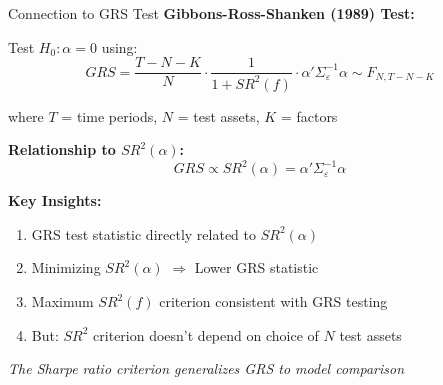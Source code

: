 \documentclass{beamer}
\begin{document}
\begin{frame}{Connection to GRS Test}
    \textbf{Gibbons-Ross-Shanken (1989) Test:}
    
    Test $H_0: \alpha = 0$ using:
    \begin{equation}\label{eq:grs_test}
        GRS = \frac{T-N-K}{N} \cdot \frac{1}{1 + SR^2(f)} \cdot \alpha' \Sigma_\varepsilon^{-1} \alpha \sim F_{N, T-N-K}
    \end{equation}
    
    where $T$ = time periods, $N$ = test assets, $K$ = factors
    
    \vspace{0.3cm}
    \textbf{Relationship to $SR^2(\alpha)$:}
    \begin{equation*}
        GRS \propto SR^2(\alpha) = \alpha' \Sigma_\varepsilon^{-1} \alpha
    \end{equation*}
    
    
    \textbf{Key Insights:}
    \begin{enumerate}
        \item GRS test statistic directly related to $SR^2(\alpha)$
        \item Minimizing $SR^2(\alpha)$ $\Rightarrow$ Lower GRS statistic
        \item Maximum $SR^2(f)$ criterion consistent with GRS testing
        \item But: $SR^2$ criterion doesn't depend on choice of $N$ test assets
    \end{enumerate}
    
    
    \textit{The Sharpe ratio criterion generalizes GRS to model comparison}
\end{frame}
\end{document}
